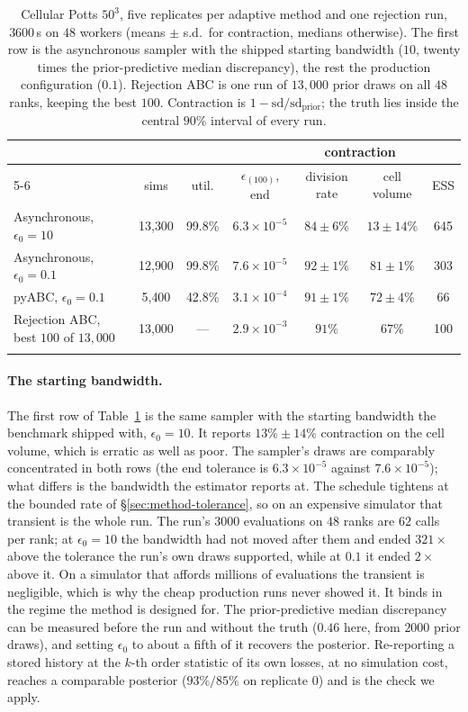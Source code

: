 \documentclass[pdflatex,sn-mathphys-num]{sn-jnl}
\theoremstyle{plain}
\theoremstyle{definition}
\begin{document}
\begin{table}[t]
\caption{Cellular Potts $50^3$, five replicates per adaptive method and one rejection run, $3600$\,s on $48$ workers (means ${\pm}$ s.d.\ for contraction, medians otherwise). The first row is the asynchronous sampler with the shipped starting bandwidth ($10$, twenty times the prior-predictive median discrepancy), the rest the production configuration ($0.1$). Rejection ABC is one run of $13{,}000$ prior draws on all $48$ ranks, keeping the best $100$. Contraction is $1-\mathrm{sd}/\mathrm{sd}_{\mathrm{prior}}$; the truth lies inside the central $90\%$ interval of every run.}\label{tab:cpm-production}
\centering
\footnotesize
\setlength{\tabcolsep}{4pt}
\begin{tabular}{@{}lcccccc@{}}
\toprule
 & & & & \multicolumn{2}{c}{contraction} & \\
\cmidrule(lr){5-6}
 & sims & util. & $\epsilon_{(100)}$, end & division rate & cell volume & ESS \\
\midrule
Asynchronous, $\epsilon_0=10$   & 13{,}300 & 99.8\% & $6.3\times10^{-5}$ & $84\pm6\%$ & $13\pm14\%$ & 645 \\
Asynchronous, $\epsilon_0=0.1$  & 12{,}900 & 99.8\% & $7.6\times10^{-5}$ & $92\pm1\%$ & $81\pm1\%$ & 303 \\
pyABC, $\epsilon_0=0.1$ & 5{,}400 & 42.8\% & $3.1\times10^{-4}$ & $91\pm1\%$ & $72\pm4\%$ & 66 \\
Rejection ABC, best $100$ of $13{,}000$ & 13{,}000 & --- & $2.9\times10^{-3}$ & $91\%$ & $67\%$ & 100 \\
\botrule
\end{tabular}
\end{table}

\paragraph{The starting bandwidth.} The first row of Table~\ref{tab:cpm-production} is the same sampler with the starting bandwidth the benchmark shipped with, $\epsilon_0=10$. It reports $13\%\pm14\%$ contraction on the cell volume, which is erratic as well as poor. The sampler's draws are comparably concentrated in both rows (the end tolerance is $6.3\times10^{-5}$ against $7.6\times10^{-5}$); what differs is the bandwidth the estimator reports at. The schedule tightens at the bounded rate of \S\ref{sec:method-tolerance}, so on an expensive simulator that transient is the whole run. The run's $3000$ evaluations on $48$ ranks are $62$ calls per rank; at $\epsilon_0=10$ the bandwidth had not moved after them and ended $321\times$ above the tolerance the run's own draws supported, while at $0.1$ it ended $2\times$ above it. On a simulator that affords millions of evaluations the transient is negligible, which is why the cheap production runs never showed it. It binds in the regime the method is designed for. The prior-predictive median discrepancy can be measured before the run and without the truth ($0.46$ here, from $2000$ prior draws), and setting $\epsilon_0$ to about a fifth of it recovers the posterior. Re-reporting a stored history at the $k$-th order statistic of its own losses, at no simulation cost, reaches a comparable posterior ($93\%/85\%$ on replicate $0$) and is the check we apply.
\end{document}
